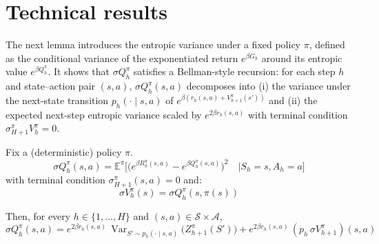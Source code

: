 \documentclass[final,12pt]{colt2026} %
\begin{document}
\section{Technical results}\label{Technical_results}
The next lemma introduces the entropic variance under a fixed policy $\pi$, defined as the conditional variance of the exponentiated return $e^{\beta G_h}$ around its entropic value $e^{\beta Q_h^\pi}$. It shows that $\sigma Q_h^\pi$ satisfies a Bellman-style recursion: for each step $h$ and state--action pair $(s,a)$, $\sigma Q_h^\pi(s,a)$ decomposes into (i) the variance under the next-state transition $p_h(\cdot\mid s,a)$ of $e^{\beta(r_h(s,a)+V_{h+1}^\pi(s'))}$ and (ii) the expected next-step entropic variance scaled by $e^{2\beta r_h(s,a)}$ with terminal condition $\sigma_{H+1}^\pi V_h^\pi=0$.
\begin{lemma}\label{entropicvariance}
Fix a (deterministic) policy $\pi$.$$\sigma Q_h^\pi(s,a) = \mathbb{E}^\pi \Bigg[ \Bigg(e^{\beta R_h^\pi(s,a)} - e^{\beta Q_h^\pi(s,a)}\Bigg)^2\quad \Bigg| S_h = s,A_h=a\Bigg] $$
    with terminal condition $\sigma_{H+1}^\pi(s,a) = 0$ and:
    $$\sigma V_h^\pi(s) = \sigma Q_h^\pi(s,\pi(s))$$

Then, for every $h\in\{1,...,H\}$ and $(s,a)\in\mathcal S\times\mathcal A$,
\begin{equation}\label{entropicvarianceequation}
\sigma Q_h^\pi(s,a)
=
e^{2\beta r_h(s,a)} \,\operatorname{Var}_{S'\sim p_h(\cdot\mid s,a)}\Big(Z_{h+1}^\pi(S')\Big)
+
e^{2\beta r_h(s,a)} \,(p_h\,\sigma V_{h+1}^\pi)(s,a)
\end{equation}
\end{lemma}
\end{document}

